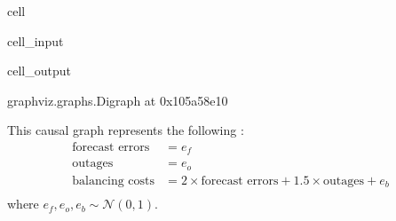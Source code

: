 \documentclass[letterpaper,10pt,english]{jupyterBook}
\begin{document}
\begin{sphinxuseclass}{cell}\begin{sphinxVerbatimInput}

\begin{sphinxuseclass}{cell_input}
\begin{sphinxVerbatim}[commandchars=\\\{\}]
  \PYG{p}{[}\PYG{p}{[}  \PYG{p}{]}
              \PYG{p}{[}  \PYG{p}{]}
              \PYG{p}{[}  \PYG{p}{]}\PYG{p}{]}

 \PYG{p}{[}  \PYG{p}{]}
\end{sphinxVerbatim}

\end{sphinxuseclass}\end{sphinxVerbatimInput}
\begin{sphinxVerbatimOutput}

\begin{sphinxuseclass}{cell_output}
\begin{sphinxVerbatim}[commandchars=\\\{\}]
\PYGZlt{}graphviz.graphs.Digraph at 0x105a58e10\PYGZgt{}
\end{sphinxVerbatim}

\end{sphinxuseclass}\end{sphinxVerbatimOutput}

\end{sphinxuseclass}
\sphinxAtStartPar
This causal graph represents the following :
\label{equation:notebooks/basic_dag_structures:b9e65048-a2cf-458b-af95-f6964295b086}\begin{align}
\text{forecast errors} &= e_f \\
\text{outages} &= e_o \\
\text{balancing costs} &= 2 \times \text{forecast errors} + 1.5 \times \text{outages} + e_b \\
\end{align}
\sphinxAtStartPar
where \(e_f, e_o, e_b \sim \mathcal{N}(0,1)\).
\end{document}
